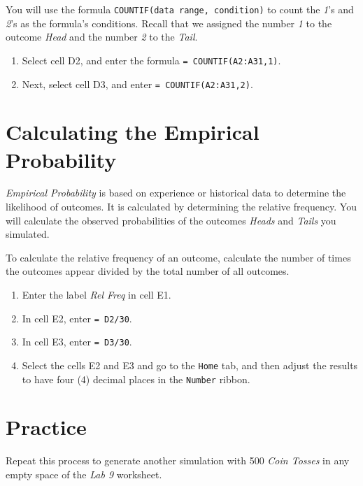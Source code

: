 \documentclass[
]{book}
\providecommand{\tightlist}{%
  \setlength{\itemsep}{0pt}\setlength{\parskip}{0pt}}
\begin{document}
You will use the formula \texttt{COUNTIF(data\ range,\ condition)} to count the \emph{1}'s and \emph{2}'s as the formula's conditions. Recall that we assigned the number \emph{1} to the outcome \emph{Head} and the number \emph{2} to the \emph{Tail}.

\begin{enumerate}
\def\labelenumi{\arabic{enumi}.}
\tightlist
\item
  Select cell D2, and enter the formula \texttt{=\ COUNTIF(A2:A31,1)}.
\item
  Next, select cell D3, and enter \texttt{=\ COUNTIF(A2:A31,2)}.
\end{enumerate}

\hypertarget{calculating-the-empirical-probability}{%
\section{Calculating the Empirical Probability}\label{calculating-the-empirical-probability}}

\emph{Empirical Probability} is based on experience or historical data to determine the likelihood of outcomes. It is calculated by determining the relative frequency. You will calculate the observed probabilities of the outcomes \emph{Heads} and \emph{Tails} you simulated.

To calculate the relative frequency of an outcome, calculate the number of times the outcomes appear divided by the total number of all outcomes.

\begin{enumerate}
\def\labelenumi{\arabic{enumi}.}
\tightlist
\item
  Enter the label \emph{Rel Freq} in cell E1.
\item
  In cell E2, enter \texttt{=\ D2/30}.
\item
  In cell E3, enter \texttt{=\ D3/30}.
\item
  Select the cells E2 and E3 and go to the \texttt{Home} tab, and then adjust the results to have four (4) decimal places in the \texttt{Number} ribbon.
\end{enumerate}

\hypertarget{practice-8}{%
\section{Practice}\label{practice-8}}

Repeat this process to generate another simulation with 500 \emph{Coin Tosses} in any empty space of the \emph{Lab 9} worksheet.
\end{document}
